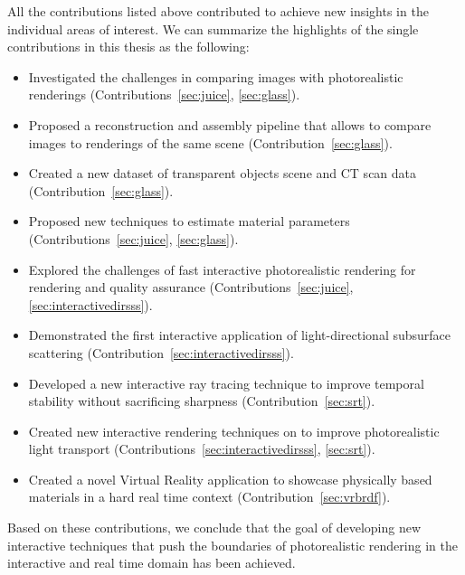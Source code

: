 All the contributions listed above contributed to achieve new insights in the individual areas of interest. We can summarize the highlights of the single contributions in this thesis as the following: 
\label{sec:conclusion}
\begin{itemize}
\item Investigated the challenges in comparing images with photorealistic renderings (Contributions~\ref{sec:juice}, \ref{sec:glass}).
\item Proposed a reconstruction and assembly pipeline that allows to compare images to renderings of the same scene (Contribution~\ref{sec:glass}).
\item Created a new dataset of transparent objects scene and CT scan data (Contribution~\ref{sec:glass}).
\item Proposed new techniques to estimate material parameters (Contributions~\ref{sec:juice}, \ref{sec:glass}).
\item Explored the challenges of fast interactive photorealistic rendering for rendering and quality assurance (Contributions~\ref{sec:juice},\ref{sec:interactivedirsss}).
\item Demonstrated the first interactive application of light-directional subsurface scattering (Contribution~\ref{sec:interactivedirsss}).
\item Developed a new interactive ray tracing technique to improve temporal stability without sacrificing sharpness (Contribution~\ref{sec:srt}).
\item Created new interactive rendering techniques on to improve photorealistic light transport (Contributions~\ref{sec:interactivedirsss}, \ref{sec:srt}).
\item Created a novel Virtual Reality application to showcase physically based materials in a hard real time context (Contribution~\ref{sec:vrbrdf}).
\end{itemize}

Based on these contributions, we conclude that the goal of developing new interactive techniques that push the boundaries of photorealistic rendering in the interactive and real time domain has been achieved. 